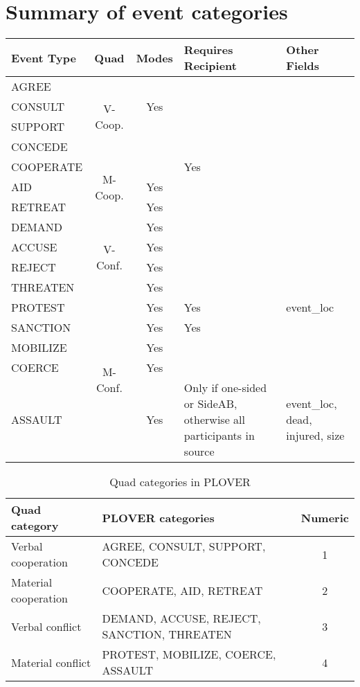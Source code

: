 \documentclass[11pt]{report}
\begin{document}
{%

\section{Summary of event categories }

\begin{tabular}{lccp{1.5in}p{1.2in}}
\toprule
Event Type & Quad & Modes & Requires Recipient & Other Fields \\
\midrule 
AGREE & \multirow{4}{*}{V-Coop.} \\
CONSULT &  & Yes \\
SUPPORT & \\
CONCEDE  & \\
\midrule
COOPERATE & \multirow{3}{*}{M-Coop.} & 	& Yes \\
AID & & Yes \\
RETREAT & & Yes \\
\midrule
DEMAND & \multirow{4}{*}{V-Conf.} & Yes  \\
ACCUSE & & Yes \\
REJECT & & Yes\\
THREATEN & & Yes \\
\midrule
PROTEST & \multirow{5}{*}{M-Conf.} & Yes 	& Yes & event\_loc \\
SANCTION & & Yes 			& Yes \\
MOBILIZE & & Yes \\
COERCE && Yes \\
ASSAULT && Yes & Only if one-sided or SideAB, otherwise all participants in source & event\_loc, dead, injured, size \\
\bottomrule
\end{tabular}

\begin{table}[htp]
\caption{Quad categories in PLOVER}
\begin{center}
\begin{tabular}{|l|l|c|}
\hline
Quad category & PLOVER categories & Numeric\\
\hline
Verbal cooperation & AGREE, CONSULT, SUPPORT, CONCEDE &  1 \\
Material cooperation & COOPERATE, AID, RETREAT & 2 \\
Verbal conflict & DEMAND, ACCUSE, REJECT, SANCTION, THREATEN & 3\\
Material conflict & PROTEST,  MOBILIZE, COERCE, ASSAULT & 4\\
\hline

\end{tabular}
\end{center}
\label{default}
\end{table}

}
\end{document}
